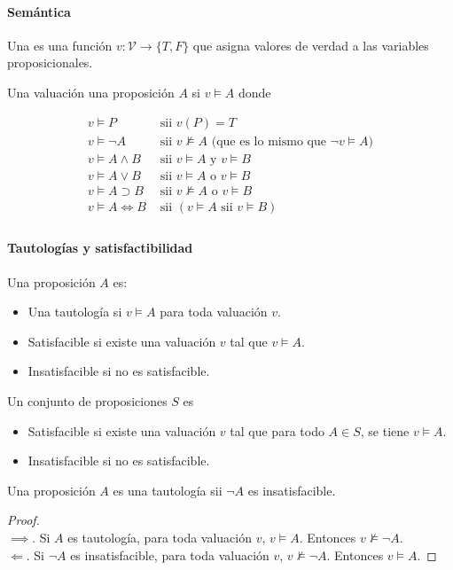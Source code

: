 \paragraph{Semántica}

Una  es una función $v:\mathcal{V}\to\{T,F\}$ que asigna valores de verdad a las variables proposicionales.

Una valuación  una proposición $A$ si $v \models A$ donde

\begin{align*}
  v \models P &\text{ sii } v(P) = T \\
  v \models \lnot A &\text{ sii } v \not\models A \text{ (que es lo mismo que $\lnot v \models A$)} \\
  v \models A \land B &\text{ sii } v \models A \text{ y } v \models B \\
  v \models A \lor B &\text{ sii } v \models A \text{ o } v \models B \\
  v \models A \supset B &\text{ sii } v \not\models A \text{ o } v \models B \\
  v \models A \iff B &\text{ sii } (v \models A \text{ sii } v \models B) \\
\end{align*}

\paragraph{Tautologías y satisfactibilidad}

Una proposición $A$ es:
\begin{itemize}
  \item Una tautología si $v \models A$ para toda valuación $v$.
  \item Satisfacible si existe una valuación $v$ tal que $v \models A$.
  \item Insatisfacible si no es satisfacible.
\end{itemize}

Un conjunto de proposiciones $S$ es
\begin{itemize}
  \item Satisfacible si existe una valuación $v$ tal que para todo $A \in S$, se tiene $v \models A$.
  \item Insatisfacible si no es satisfacible.
\end{itemize}

\begin{teo}
  Una proposición $A$ es una tautología sii $\lnot A$ es insatisfacible.
\end{teo}
\begin{proof}
  \hspace{0.5em}\\
  $\implies$. Si $A$ es tautología, para toda valuación $v$, $v \models A$. Entonces $v \not\models \lnot A$.\\
  $\Longleftarrow$. Si $\lnot A$ es insatisfacible, para toda valuación $v$, $v \not\models \lnot A$. Entonces $v \models A$.
\end{proof}

